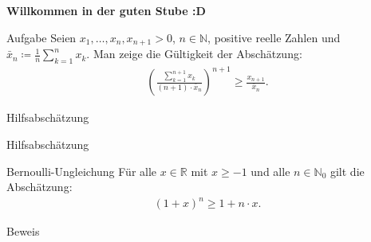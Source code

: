 \documentclass[10pt]{beamer}
\title{}
\author{Artur's \( \oint \) Mathematikstübchen}
\date{}
\def\bN{\mathbb{N}}
\def\bR{\mathbb{R}}
\begin{document}

\begin{frame}
    \begin{center}
        \textbf{\huge Willkommen in der guten Stube \newline \newline :D}
    \end{center}
\end{frame}




\begin{frame}
    \begin{alertblock}{Aufgabe}
        Seien \( x_{1}, \ldots, x_{n}, x_{n + 1} > 0 \), \( n \in \bN \), positive reelle Zahlen und \( \bar{x}_{n} \coloneq \frac{1}{n} \sum_{k = 1}^{n} x_{k} \). Man zeige die Gültigkeit der Abschätzung:
        \begin{align*}
            \left( \frac{\sum_{k = 1}^{n + 1} x_{k}}{\left( n + 1 \right) \cdot \bar{x}_{n}} \right)^{n + 1}
            \geq \frac{x_{n + 1}}{\bar{x}_{n}}.
        \end{align*}
    \end{alertblock}
\end{frame}



\begin{frame}{Hilfsabschätzung}
    
\end{frame}



\begin{frame}{Hilfsabschätzung}
    \begin{block}{Bernoulli-Ungleichung}
        Für alle \( x \in \bR \) mit \( x \geq - 1 \) und alle \( n \in \bN_{0} \) gilt die Abschätzung:
        \begin{align*}
            \left( 1 + x \right)^{n}
            \geq 1 + n \cdot x.
        \end{align*}
    \end{block}
\end{frame}



\begin{frame}{Beweis}
    
\end{frame}
\end{document}
